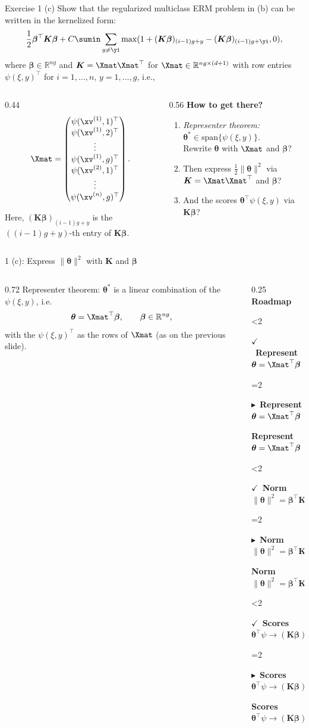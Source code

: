 \documentclass[aspectratio=169]{beamer}
\newcommand{\thetab}{\bm{\theta}}
\newcommand{\betav}{\bm{\beta}}
\newcommand{\Kmat}{\bm{K}}
\newcommand{\qbox}[4]{%
	\ifnum#2<#1
		\begin{tcolorbox}[colback=green!6,colframe=green!35!black,boxsep=1pt,left=4pt,right=4pt,top=2pt,bottom=2pt,arc=2pt,before skip=3pt,after skip=3pt]
		{\footnotesize\textcolor{green!45!black}{$\checkmark$~\textbf{#3}}}\\[1pt]{\scriptsize\textcolor{black!55}{#4}}
		\end{tcolorbox}
	\else\ifnum#2=#1
		\begin{tcolorbox}[colback=blue!12,colframe=blue!55!black,boxsep=1pt,left=4pt,right=4pt,top=2pt,bottom=2pt,arc=2pt,before skip=3pt,after skip=3pt]
		{\footnotesize\textcolor{blue!60!black}{$\blacktriangleright$~\textbf{#3}}}\\[1pt]{\scriptsize #4}
		\end{tcolorbox}
	\else
		\begin{tcolorbox}[colback=black!3,colframe=black!20,boxsep=1pt,left=4pt,right=4pt,top=2pt,bottom=2pt,arc=2pt,before skip=3pt,after skip=3pt]
		{\footnotesize\textcolor{black!45}{\textbf{#3}}}\\[1pt]{\scriptsize\textcolor{black!45}{#4}}
		\end{tcolorbox}
	\fi\fi}
\newcommand{\qroadmapc}[1]{%
	{\footnotesize\bfseries Roadmap}\par
	\qbox{#1}{1}{Represent}{$\thetab = \Xmat^\top\betav$}%
	\qbox{#1}{2}{Norm}{$\|\thetab\|^2 = \betav^\top\Kmat\betav$}%
	\qbox{#1}{3}{Scores}{$\thetab^\top\psi \to (\Kmat\betav)$}}
\begin{document}
\begin{frame}{Exercise 1 (c)}
	\footnotesize
	Show that the regularized multiclass ERM problem in (b) can be written in the kernelized form:
	$$\frac{1}{2} \betav^\top \Kmat \betav + C\sumin \sum_{y \neq \yi} \max (1 + (\Kmat \betav)_{(i-1)g + y} - (\Kmat \betav)_{(i-1)g + \yi}, 0),$$
	where $\betav \in \mathbb{R}^{ng}$ and $\Kmat = \Xmat \Xmat^\top$ for $\Xmat \in \mathbb{R}^{ng \times (d+1)}$ with row entries $\psi(\xi, y)^\top $ for $i = 1, \ldots, n$, $y = 1, \ldots, g$, i.e.,

	\medskip
	\begin{columns}[T]
	\begin{column}{0.44\textwidth}
	$$\Xmat = \begin{pmatrix}
		\psi(\xv^{(1)}, 1)^\top \\
		\psi(\xv^{(1)}, 2)^\top \\
		\vdots \\
		\psi(\xv^{(1)}, g)^\top \\
		\psi(\xv^{(2)}, 1)^\top \\
		\vdots \\
		\psi(\xv^{(n)}, g)^\top \\
	\end{pmatrix}.$$

	Here, $(\Kmat \betav)_{(i-1)g + y}$ is the $((i-1)g + y)$-th entry of $\Kmat \betav$.
	\end{column}
	\begin{column}{0.56\textwidth}
	\textbf{How to get there?}
	\begin{enumerate}
		\setlength{\itemsep}{7pt}
		\item \emph{Representer theorem:} $\thetab^* \in \mathrm{span}\{\psi(\xi, y)\}$. \\ Rewrite $\thetab$ with $\Xmat$ and $\betav$?
		\item Then express $\tfrac12\|\thetab\|^2$ via $\Kmat = \Xmat\Xmat^\top$ and $\betav$?
		\item And the scores $\thetab^\top \psi(\xi, y)$ via $\Kmat\betav$?
	\end{enumerate}
	\end{column}
	\end{columns}
\end{frame}

\begin{frame}{1 (c): Express $\|\thetab\|^2$ with $\Kmat$ and $\betav$}
	\small
	\begin{columns}[T]
	\begin{column}{0.72\textwidth}
	Representer theorem: $\thetab^*$ is a linear combination of the $\psi(\xi, y)$, i.e.
	\[ \thetab = \Xmat^\top \betav, \qquad \betav \in \mathbb{R}^{ng}, \]
	with the $\psi(\xi, y)^\top$ as the rows of $\Xmat$ (as on the previous slide).
	\uncover<2->{
	\medskip
	With $\Kmat = \Xmat \Xmat^\top$:
	\[ \|\thetab\|^2 = \thetab^\top \thetab = (\Xmat^\top \betav)^\top \Xmat^\top \betav = \boxed{\,\betav^\top \Kmat \betav\,}. \]
	}
	\end{column}
	\begin{column}{0.25\textwidth}
	\qroadmapc{2}
	\end{column}
	\end{columns}
\end{frame}
\end{document}
